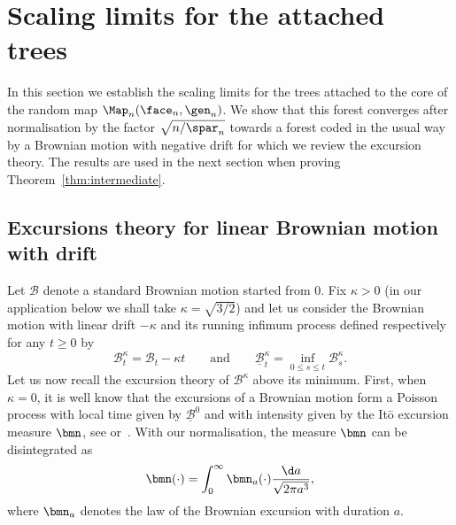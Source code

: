 \section{Scaling limits for the attached trees}
\label{sec:contour}

In this section we establish the scaling limits for the trees attached to the core of the random map $\Map_n(\face_n, \gen_n)$.
We show that this forest converges after normalisation by the factor $ \sqrt{n/\spar_n}$ towards a forest coded in the usual way by a Brownian motion with negative drift for which we review the excursion theory. The results are used in the next section when proving Theorem~\ref{thm:intermediate}.

\subsection{Excursions theory for linear Brownian motion with drift}
\label{sec:excursionBMD}

Let $\mathcal{B}$ denote a standard Brownian motion started from $0$. Fix $\kappa >0$ (in our application below we shall take $\kappa = \sqrt{3/2}$) and let us consider the Brownian motion with linear drift $-\kappa$ and its running infimum process defined respectively for any $t \ge 0$ by
\[
\mathcal{B}^{\kappa}_{t} = \mathcal{B}_{t}-\kappa t
\qquad\text{and}\qquad
\underline{\mathcal{B}}^{\kappa}_{t} = \inf_{0 \leq s\leq t} \mathcal{B}^{\kappa}_{s}.
\]
Let us now recall the excursion theory of $\mathcal{B}^{\kappa}$ above its minimum.
First, when $\kappa=0$, it is well know that the excursions of a Brownian motion form a Poisson process with local time given by $\underline{\mathcal{B}}^{0}$ and with intensity given by the It\={o} excursion measure $\bmn$, see \eg \cite{LG10} or~\cite[Chap.\,XII]{RY99}. With our normalisation, the measure $\bmn$ can be disintegrated as
\[
\bmn(\cdot) = \int_0^\infty \bmn_a(\cdot) \frac{\d a}{\sqrt{2\pi a^3}},
\]
where $\bmn_a$ denotes the law of the Brownian excursion with duration $a$.

